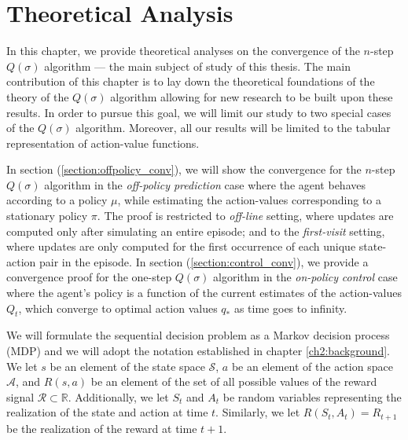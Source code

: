 \providecommand{\main}{..}



\chapter{Theoretical Analysis} \label{ch4:convergence}

In this chapter, we provide theoretical analyses on the convergence of the $n$-step $Q(\sigma)$ algorithm --- the main subject of study of this thesis.
The main contribution of this chapter is to lay down the theoretical foundations of the theory of the $Q(\sigma)$ algorithm allowing for new research to be built upon these results.
In order to pursue this goal, we will limit our study to two special cases of the $Q(\sigma)$ algorithm.
Moreover, all our results will be limited to the tabular representation of action-value functions.

In section (\ref{section:offpolicy_conv}), we will show the convergence for the $n$-step $Q(\sigma)$ algorithm in the \textit{off-policy prediction} case where the agent behaves according to a policy $\mu$, while estimating  the action-values corresponding to a stationary policy $\pi$.
The proof is restricted to \textit{off-line} setting, where updates are computed only after simulating an entire episode; and to the \textit{first-visit} setting, where updates are only computed for the first occurrence of each unique state-action pair in the episode.
In section (\ref{section:control_conv}), we provide a convergence proof for the one-step $Q(\sigma)$ algorithm in the \textit{on-policy} \textit{control} case where the agent's policy is a function of the current estimates of the action-values $Q_t$, which converge to optimal action values $q_*$ as time goes to infinity.

We will formulate the sequential decision problem as a Markov decision process (MDP) and we will adopt the notation established in chapter \ref{ch2:background}. %
We let $s$ be an element of the state space $\mathcal{S}$, $a$ be an element of the action space $\mathcal{A}$, and $R(s,a)$ be an element of the set of all possible values of the reward signal $\mathcal{R} \subset \mathbb{R}$.
Additionally, we let $S_t$ and $A_t$ be random variables representing the realization of the state and action at time $t$.
Similarly, we let $R(S_t,A_t) = R_{t+1}$ be the realization of the reward at time $t+1$.

